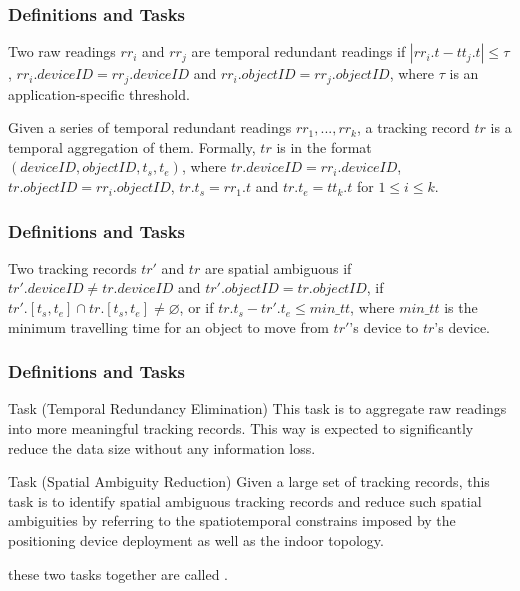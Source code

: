 
\begin{frame}
\frametitle{Definitions and Tasks}

\begin{definition}
  Two raw readings $rr_i$ and $rr_j$ are temporal redundant readings if $|rr_i.t - tt_j.t| \leq \tau$, $rr_i.deviceID = rr_j.deviceID$ and $rr_i.objectID = rr_j.objectID$, where $\tau$ is an application-specific threshold.
\end{definition}

\begin{definition}
  Given a series of temporal redundant readings $rr_1, ..., rr_k$, a tracking record $tr$ is a temporal aggregation of them. Formally, $tr$ is in the format $(deviceID, objectID, t_s, t_e)$, where $tr.deviceID = rr_i.deviceID$, $tr.objectID = rr_i.objectID$, $tr.t_s = rr_1.t$ and $tr.t_e = tt_k.t$ for $1 \leq i \leq k$.
\end{definition}

\end{frame}


\begin{frame}
\frametitle{Definitions and Tasks}

\begin{definition}
  Two tracking records $tr'$ and $tr$ are spatial ambiguous if $tr'.deviceID \neq tr.deviceID$ and $tr'.objectID = tr.objectID$, if $tr'.[t_s, t_e] \cap tr.[t_s, t_e] \neq \varnothing $, or if $tr.t_s - tr'.t_e \leq min\_tt$, where $min\_tt$ is the minimum travelling time for an object to move from $tr'$'s device to $tr$'s device.
\end{definition}

\end{frame}


\begin{frame}
\frametitle{Definitions and Tasks}

\begin{block}{Task (Temporal Redundancy Elimination)}
  This task is to aggregate raw readings into more meaningful tracking records. This way is expected to significantly reduce the data size without any information loss.
\end{block}

\begin{block}{Task (Spatial Ambiguity Reduction)}
  Given a large set of tracking records, this task is to identify spatial ambiguous tracking records and reduce such spatial ambiguities by referring to the spatiotemporal constrains imposed by the positioning device deployment as well as the indoor topology.
\end{block}

\textrm{these two tasks together are called }.

\end{frame}

